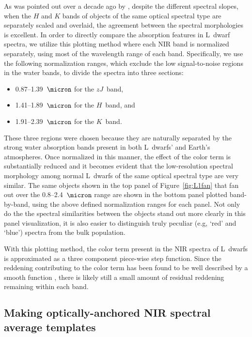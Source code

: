 \documentclass[12pt,preprint]{aastex}
\begin{document}
As was pointed out over a decade ago by \citet{Leggett:2003tm}, despite the different spectral slopes, when the $H$ and $K$ bands of objects of the same optical spectral type are separately scaled and overlaid, the agreement between the spectral morphologies is excellent.
In order to directly compare the absorption features in L~dwarf spectra, we utilize this plotting method where each NIR band is normalized separately, using most of the wavelength range of each band. 
Specifically, we use the following normalization ranges, which exclude the low signal-to-noise regions in the water bands, to divide the spectra into three sections: 
\begin{itemize} \itemsep1pt \parskip0pt 
\item 0.87--1.39~$\micron$ for the $zJ$~band,
\item 1.41--1.89~$\micron$ for the $H$~band, and 
\item 1.91--2.39~$\micron$ for the $K$~band.
\end{itemize}
These three regions were chosen because they are naturally separated by the strong water absorption bands present in both L~dwarfs' and Earth's atmospheres. 
Once normalized in this manner, the effect of the color term is substantially reduced and it becomes evident that the low-resolution spectral morphology among normal L~dwarfs of the same optical spectral type are very similar. 
The same objects shown in the top panel of Figure~\ref{fig:L1fan} that fan out over the 0.8--2.4~$\micron$ range are shown in the bottom panel plotted band-by-band, using the above defined normalization ranges for each panel. 
Not only do the the spectral similarities between the objects stand out more clearly in this panel visualization, it is also easier to distinguish truly peculiar (e.g, `red' and `blue') spectra from the bulk population.

With this plotting method, the color term present in the NIR spectra of L~dwarfs is approximated as a three component piece-wise step function. Since the reddening contributing to the color term has been found to be well described by a smooth function \citep{Marocco:2014kr,Hiranaka:2015va}, there is likely still a small amount of residual reddening remaining within each band.

\clearpage
\subsection{Making optically-anchored NIR spectral average templates}
\label{sec:templates}
\end{document}
